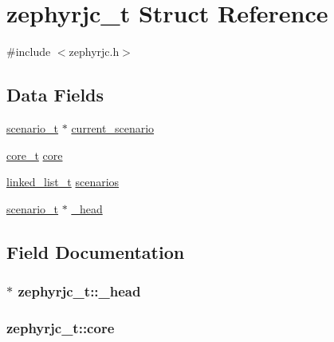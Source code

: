 \hypertarget{structzephyrjc__t}{}\section{zephyrjc\+\_\+t Struct Reference}
\label{structzephyrjc__t}


{\ttfamily \#include $<$zephyrjc.\+h$>$}

\subsection*{Data Fields}
\begin{DoxyCompactItemize}
\item 
\hyperlink{structscenario__t}{scenario\+\_\+t} $\ast$ \hyperlink{structzephyrjc__t_a72c00754a438f734de92e2dfc26af6fd}{current\+\_\+scenario}
\item 
\hyperlink{structcore__t}{core\+\_\+t} \hyperlink{structzephyrjc__t_a800442229142f5481edfa1ef68828ed8}{core}
\item 
\hyperlink{structlinked__list__t}{linked\+\_\+list\+\_\+t} \hyperlink{structzephyrjc__t_a1a1b1b67ffc0bb743303ebebe105e7ad}{scenarios}
\item 
\hyperlink{structscenario__t}{scenario\+\_\+t} $\ast$ \hyperlink{structzephyrjc__t_afd66a9f9f995b6a6a21d4d429668c5ee}{\+\_\+head}
\end{DoxyCompactItemize}


\subsection{Field Documentation}
\subsubsection[{\texorpdfstring{\+\_\+head}{\_head}}]{$\ast$ zephyrjc\+\_\+t\+::\+\_\+head}\hypertarget{structzephyrjc__t_afd66a9f9f995b6a6a21d4d429668c5ee}{}\label{structzephyrjc__t_afd66a9f9f995b6a6a21d4d429668c5ee}
\subsubsection[{\texorpdfstring{core}{core}}]{ zephyrjc\+\_\+t\+::core}\hypertarget{structzephyrjc__t_a800442229142f5481edfa1ef68828ed8}{}\label{structzephyrjc__t_a800442229142f5481edfa1ef68828ed8}
